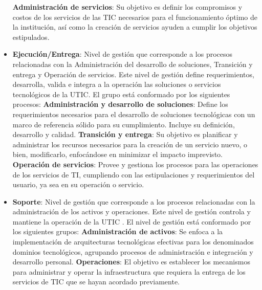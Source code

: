 \begin{itemize}
			\subitem \textbf{Administración de servicios}: Su objetivo es definir los compromisos y costos de los servicios de las TIC necesarios para el funcionamiento óptimo de la institución, así como la creación de servicios ayuden a cumplir los objetivos estipulados\cite{MAAGTICSIOrganizacion}.
		\item \textbf{Ejecución/Entrega}: Nivel de gestión que corresponde a los procesos relacionadas con la Administración del desarrollo de soluciones, Transición y entrega y Operación de servicios. Este nivel de gestión define requerimientos, desarrolla, valida e integra a la operación las soluciones o servicios tecnológicos de la UTIC\cite{MAAGTICSIEjecucion}. El grupo está conformado por los siguientes procesos:
			\subitem \textbf{Administración y desarrollo de soluciones}: Define los requerimientos necesarios para el desarrollo de soluciones tecnológicas con un marco de referencia sólido para su cumplimiento. Incluye su definición, desarrollo y calidad\cite{MAAGTICSIEjecucion}.
			\subitem \textbf{Transición y entrega}: Su objetivo es planificar y administrar los recursos necesarios para la creación de un servicio nuevo, o bien, modificarlo, enfocándose en minimizar el impacto imprevisto\cite{MAAGTICSIEjecucion}.
			\subitem \textbf{Operación de servicios}: Provee y gestiona los procesos para las operaciones de los servicios de TI, cumpliendo con las estipulaciones y requerimientos del usuario, ya sea en su operación o servicio\cite{MAAGTICSIEjecucion}.
		\item \textbf{Soporte}: Nivel de gestión que corresponde a los procesos relacionadas con la administración de los activos y operaciones. Este nivel de gestión controla y mantiene la operación de la UTIC \cite{MAAGTICSISoporte}. El nivel de gestión está conformado por los siguientes grupos:
			\subitem \textbf{Administración de activos}: Se enfoca a la implementación de arquitecturas tecnológicas efectivas para los denominados dominios tecnológicos, agrupando procesos de administración e integración y desarrollo personal\cite{MAAGTICSISoporte}.
			\subitem \textbf{Operaciones}: El objetivo es establecer los mecanismos para administrar y operar la infraestructura que requiera la entrega de los servicios de TIC que se hayan acordado previamente\cite{MAAGTICSISoporte}.
	\end{itemize}
	
